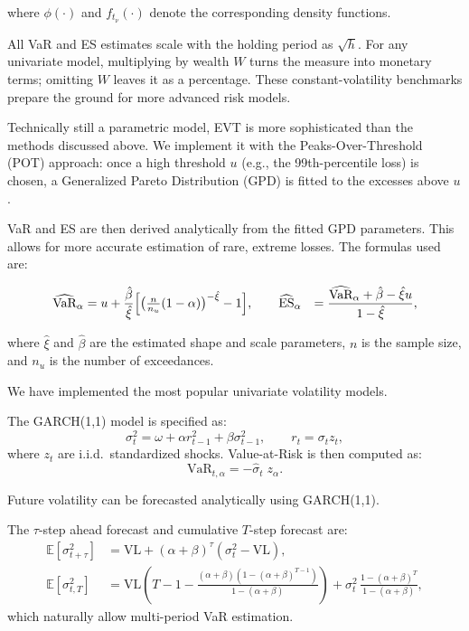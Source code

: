 \documentclass[12pt]{article}
\begin{document}
where $\phi(\cdot)$ and $f_{t_\nu}(\cdot)$ denote the corresponding density functions.

All VaR and ES estimates scale with the holding period as $\sqrt{h}$. For any univariate model, multiplying by wealth $W$ turns the measure into monetary terms; omitting $W$ leaves it as a percentage. These constant-volatility benchmarks prepare the ground for more advanced risk models.

\vspace{1em}
\underline{}

\vspace{0.6em}

Technically still a parametric model, EVT is more sophisticated than the methods discussed above. We implement it with the Peaks-Over-Threshold (POT) approach: once a high threshold $u$ (e.g., the 99th-percentile loss) is chosen, a Generalized Pareto Distribution (GPD) is fitted to the excesses above $u$. 

VaR and ES are then derived analytically from the fitted GPD parameters. This allows for more accurate estimation of rare, extreme losses. The formulas used are:

\[
\begin{aligned}
\widehat{\text{VaR}}_\alpha &= u + \frac{\hat{\beta}}{\hat{\xi}}
\Bigl[\bigl(\tfrac{n}{n_u}(1-\alpha)\bigr)^{-\hat{\xi}} - 1\Bigr],\qquad
\widehat{\text{ES}}_\alpha &= \frac{\widehat{\text{VaR}}_\alpha + \hat{\beta} - \hat{\xi} u}{1 - \hat{\xi}},
\end{aligned}
\]

where $\hat{\xi}$ and $\hat{\beta}$ are the estimated shape and scale parameters, $n$ is the sample size, and $n_u$ is the number of exceedances.


\vspace{1em}
\underline{}

\vspace{0.6em}

We have implemented the most popular univariate volatility models.

The GARCH(1,1) model is specified as:
\[
  \sigma_t^2 = \omega + \alpha r_{t-1}^2 + \beta \sigma_{t-1}^2, \qquad r_t = \sigma_t z_t,
\]
where $z_t$ are i.i.d.\ standardized shocks. Value-at-Risk is then computed as:
\[
  \text{VaR}_{t,\alpha} = -\hat{\sigma}_t \; z_\alpha.
\]

Future volatility can be forecasted analytically using GARCH(1,1). 

The $\tau$-step ahead forecast and cumulative $T$-step forecast are:
\begin{align*}
  \mathbb{E}[\sigma_{t+\tau}^2] &= \mathrm{VL} + (\alpha+\beta)^\tau(\sigma_t^2 - \mathrm{VL}),  \\  
  \mathbb{E}[\sigma_{t,T}^2] &= \mathrm{VL}\left(T-1 - \frac{(\alpha+\beta)(1-(\alpha+\beta)^{T-1})}{1-(\alpha+\beta)}\right)
    + \sigma_t^2\,\frac{1-(\alpha+\beta)^T}{1-(\alpha+\beta)},
\end{align*}
which naturally allow multi-period VaR estimation.
\end{document}
